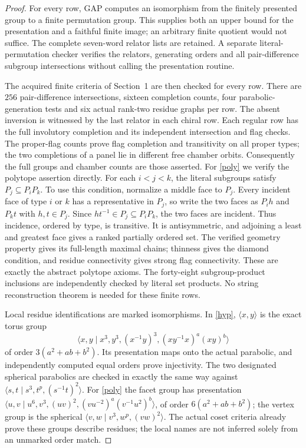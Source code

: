 \documentclass[11pt,a4paper]{article}
\newcommand{\gen}[1]{\langle #1\rangle}\newcommand{\Aut}{\operatorname{Aut}}
\begin{document}
\begin{proof}
For every row, GAP computes an isomorphism from the finitely presented
group to a finite permutation group. This supplies both an upper bound
for the presentation and a faithful finite image; an arbitrary finite
quotient would not suffice. The complete seven-word relator lists are
retained. A separate literal-permutation checker verifies the relators,
generating orders and all pair-difference subgroup intersections without
calling the presentation routine.

The acquired finite criteria of Section~1 are then checked for every
row. There are $256$ pair-difference intersections, sixteen completion
counts, four parabolic-generation tests and six actual rank-two residue
graphs per row. The absent inversion is witnessed by the last relator
in each chiral row. Each regular row has the full involutory completion
and its independent intersection and flag checks. The proper-flag
counts prove flag completion and transitivity on all proper types;
the two completions of a panel lie in different free chamber orbits.
Consequently the full groups and chamber counts are those asserted.
For \eqref{poly} we verify the polytope assertion directly. For each
$i<j<k$, the literal subgroups satisfy $P_j\subseteq P_iP_k$.
To use this condition, normalize a middle face to $P_j$. Every incident
face of type $i$ or $k$ has a representative in $P_j$, so write the two
faces as $P_ih$ and $P_kt$ with $h,t\in P_j$. Since
$ht^{-1}\in P_j\subseteq P_iP_k$, the two faces are incident.
Thus incidence, ordered by type, is transitive. It is antisymmetric,
and adjoining a least and greatest face gives a ranked partially ordered
set. The verified geometry property gives its full-length maximal chains;
thinness gives the diamond condition, and residue connectivity gives
strong flag connectivity. These are exactly the abstract polytope axioms.
The forty-eight subgroup-product inclusions are independently checked by
literal set products. No string reconstruction theorem is needed for
these finite rows.

Local residue identifications are marked isomorphisms. In \eqref{hyp},
$\gen{x,y}$ is the exact torus group
\[
 \gen{x,y\mid x^3,y^3,(x^{-1}y)^3,(xy^{-1}x)^a(xy)^b}
\]
of order $3(a^2+ab+b^2)$. Its presentation maps onto the actual
parabolic, and independently computed equal orders prove injectivity.
The two designated spherical parabolics are checked in exactly the
same way against $\gen{s,t\mid s^3,t^p,(s^{-1}t)^2}$.
For \eqref{poly} the facet group has presentation
$\gen{u,v\mid u^6,v^3,(uv)^2,(vu^{-2})^a(v^{-1}u^2)^b}$,
of order $6(a^2+ab+b^2)$; the vertex group is the spherical
$\gen{v,w\mid v^3,w^p,(vw)^2}$.
The actual coset criteria already prove these groups describe residues;
the local names are not inferred solely from an unmarked order match.
\end{proof}
\end{document}
